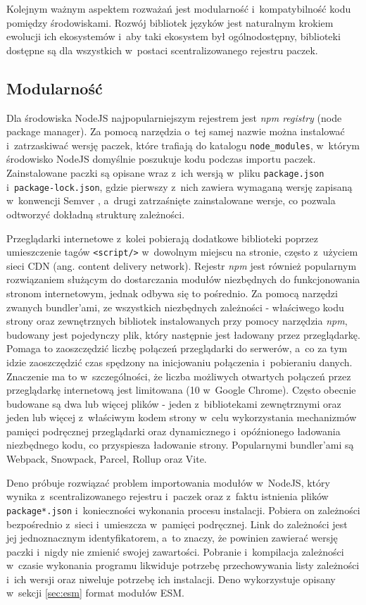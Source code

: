 Kolejnym ważnym aspektem rozważań jest modularność i~kompatybilność kodu pomiędzy środowiskami. Rozwój bibliotek języków jest naturalnym krokiem ewolucji ich ekosystemów i~aby taki ekosystem był ogólnodostępny, biblioteki dostępne są dla wszystkich w~postaci scentralizowanego rejestru paczek. 

\subsection{Modularność}

Dla środowiska NodeJS najpopularniejszym rejestrem jest \textit{npm registry} (node package manager). Za pomocą narzędzia o~tej samej nazwie można instalować i~zatrzaskiwać wersję paczek, które trafiają do katalogu \lstinline{node_modules}, w~którym środowisko NodeJS domyślnie poszukuje kodu podczas importu paczek. Zainstalowane paczki są opisane wraz z~ich wersją w~pliku \mbox{\lstinline{package.json}} i~\lstinline{package-lock.json}, gdzie pierwszy z~nich zawiera wymaganą wersję zapisaną w~konwencji Semver \cite{semver}, a~drugi zatrzaśnięte zainstalowane wersje, co pozwala odtworzyć dokładną strukturę zależności.

Przeglądarki internetowe z~kolei pobierają dodatkowe biblioteki poprzez umieszczenie tagów \lstinline{<script/>} w~dowolnym miejscu na stronie, często z~użyciem sieci CDN (ang. content delivery network). Rejestr \textit{npm} jest również popularnym rozwiązaniem służącym do dostarczania modułów niezbędnych do funkcjonowania stronom internetowym, jednak odbywa się to pośrednio. Za pomocą narzędzi zwanych bundler'ami, ze wszystkich niezbędnych zależności - właściwego kodu strony oraz zewnętrznych bibliotek instalowanych przy pomocy narzędzia \textit{npm}, budowany jest pojedynczy plik, który następnie jest ładowany przez przeglądarkę. Pomaga to zaoszczędzić liczbę połączeń przeglądarki do serwerów, a~co za tym idzie zaoszczędzić czas spędzony na inicjowaniu połączenia i~pobieraniu danych. Znaczenie ma to w~szczególności, że liczba możliwych otwartych połączeń przez przeglądarkę internetową jest limitowana (10 w~Google Chrome). Często obecnie budowane są dwa lub więcej plików - jeden z~bibliotekami zewnętrznymi oraz jeden lub więcej z~właściwym kodem strony w~celu wykorzystania mechanizmów pamięci podręcznej przeglądarki oraz dynamicznego i~opóźnionego ładowania niezbędnego kodu, co przyspiesza ładowanie strony. Popularnymi bundler'ami są Webpack, Snowpack, Parcel, Rollup oraz Vite.

Deno próbuje rozwiązać problem importowania modułów w~NodeJS, który wynika z~scentralizowanego rejestru i~paczek oraz z~faktu istnienia plików \lstinline{package*.json} i~konieczności wykonania procesu instalacji. Pobiera on zależności bezpośrednio z~sieci i~umieszcza w~pamięci podręcznej. Link do zależności jest jej jednoznacznym identyfikatorem, a~to znaczy, że powinien zawierać wersję paczki i~nigdy nie zmienić swojej zawartości. Pobranie i~kompilacja zależności w~czasie wykonania programu likwiduje potrzebę przechowywania listy zależności i~ich wersji oraz niweluje potrzebę ich instalacji. Deno wykorzystuje opisany w~sekcji \ref{sec:esm} format modułów ESM.

